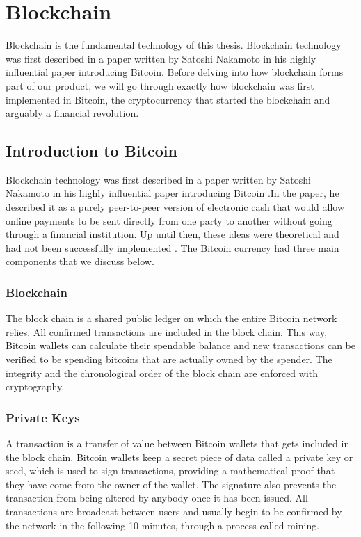 \chapter{Blockchain}

Blockchain is the fundamental technology of this thesis. Blockchain technology was first described in a paper written by Satoshi Nakamoto in his highly influential paper introducing Bitcoin. Before delving into how blockchain forms part of our product, we will go through exactly how blockchain was first implemented in Bitcoin, the cryptocurrency that started the blockchain and arguably a financial revolution.

\section{Introduction to Bitcoin}
Blockchain technology was first described in a paper written by Satoshi Nakamoto in his highly influential paper introducing Bitcoin \cite{Nakamoto2008Bitcoin:System}.In the paper, he described it as a purely peer-to-peer version of electronic cash that would allow online payments to be sent directly from one party to another without going through a financial institution. Up until then, these ideas were theoretical and had not been successfully implemented \cite{Chaum1983BlindPayments}. The Bitcoin currency had three main components that we discuss below.\cite{Economist2013HowWork}

\subsection{Blockchain}
The block chain is a shared public ledger on which the entire Bitcoin network relies. All confirmed transactions are included in the block chain. This way, Bitcoin wallets can calculate their spendable balance and new transactions can be verified to be spending bitcoins that are actually owned by the spender. The integrity and the chronological order of the block chain are enforced with cryptography.

\subsection{Private Keys}
A transaction is a transfer of value between Bitcoin wallets that gets included in the block chain. Bitcoin wallets keep a secret piece of data called a private key or seed, which is used to sign transactions, providing a mathematical proof that they have come from the owner of the wallet. The signature also prevents the transaction from being altered by anybody once it has been issued. All transactions are broadcast between users and usually begin to be confirmed by the network in the following 10 minutes, through a process called mining.


